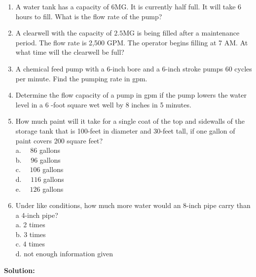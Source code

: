 \begin{enumerate}
\item  A water tank has a capacity of 6MG. It is currently half full. It will take 6 hours to fill. What is the flow rate of the pump?\\


\item  A clearwell with the capacity of $2.5 \mathrm{MG}$ is being filled after a maintenance period. The flow rate is 2,500 GPM. The operator begins filling at 7 AM. At what time will the clearwell be full?\\

  \item A chemical feed pump with a 6-inch bore and a 6-inch stroke pumps 60 cycles per minute. Find the pumping rate in gpm.
  
  \item Determine the flow capacity of a pump in gpm if the pump lowers the water level in a 6 -foot square wet well by 8 inches in 5 minutes.

\item How much paint will it take for a single coat of the top and sidewalls of the storage tank that is 100-feet in diameter and 30-feet tall, if one gallon of paint covers 200 square feet?\\
a. $\quad 86$ gallons\\
b. $\quad 96$ gallons\\
c. $\quad 106$ gallons\\
d. $\quad 116$ gallons\\
e. $\quad 126$ gallons

\item Under like conditions, how much more water would an 8-inch pipe carry than a 4-inch pipe?\\
a.	2 times\\
b.	3 times\\
c.	4 times\\
d.	not enough information given\\


\end{enumerate}


\textbf{Solution:}\\

